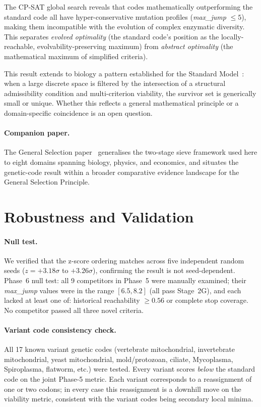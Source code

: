 \documentclass[10pt,twocolumn]{article}
\begin{document}
The CP-SAT global search reveals that codes mathematically outperforming the
standard code all have hyper-conservative mutation profiles (\emph{max\_jump}
$\leq 5$), making them incompatible with the evolution of complex enzymatic
diversity. This separates \emph{evolved optimality} (the standard code's
position as the locally-reachable, evolvability-preserving maximum) from
\emph{abstract optimality} (the mathematical maximum of simplified criteria).

This result extends to biology a pattern established for the Standard
Model~\cite{SpivackP24}: when a large discrete space is filtered by the
intersection of a structural admissibility condition and multi-criterion
viability, the survivor set is generically small or unique. Whether this
reflects a general mathematical principle or a domain-specific coincidence
is an open question.

\paragraph{Companion paper.}
The General Selection paper~\cite{SpivackGeneralSelection} generalises the
two-stage sieve framework used here to eight domains spanning biology, physics,
and economics, and situates the genetic-code result within a broader comparative
evidence landscape for the General Selection Principle.

\section{Robustness and Validation}

\paragraph{Null test.}
We verified that the z-score ordering matches across five independent random seeds
($z = +3.18\sigma$ to $+3.26\sigma$), confirming the result is not seed-dependent.
Phase~6 null test: all 9 competitors in Phase~5 were manually examined; their
\emph{max\_jump} values were in the range $[6.5, 8.2]$ (all pass Stage~2G), and
each lacked at least one of: historical reachability $\geq 0.56$ or complete stop
coverage. No competitor passed all three novel criteria.

\paragraph{Variant code consistency check.}
All 17 known variant genetic codes (vertebrate mitochondrial, invertebrate
mitochondrial, yeast mitochondrial, mold/protozoan, ciliate, Mycoplasma,
Spiroplasma, flatworm, etc.) were tested. Every variant scores \emph{below}
the standard code on the joint Phase-5 metric. Each variant corresponds to a
reassignment of one or two codons; in every case this reassignment is a
downhill move on the viability metric, consistent with the variant codes being
secondary local minima.
\end{document}
